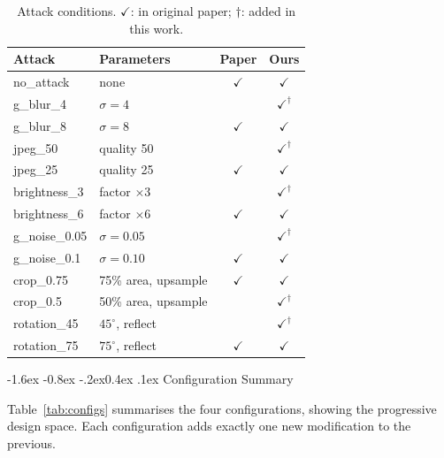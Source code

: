 \documentclass[10pt,twocolumn]{article}
\makeatletter
\renewcommand\subsection{\@startsection{subsection}{2}{\z@}%
  {-1.6ex \@plus -0.8ex \@minus -.2ex}{0.4ex \@plus .1ex}%
  {\normalfont\normalsize\itshape}}
\makeatother
\begin{document}
\begin{table}[htbp]
  \centering
  \caption{Attack conditions. $\checkmark$: in original paper;
    $\dagger$: added in this work.}
  \label{tab:attacks}
  \setlength{\tabcolsep}{3pt}
  \small
  \begin{tabular}{llcc}
    \toprule
    \textbf{Attack} & \textbf{Parameters} & \textbf{Paper} & \textbf{Ours} \\
    \midrule
    no\_attack        & none                 & $\checkmark$ & $\checkmark$ \\
    g\_blur\_4        & $\sigma{=}4$         & & $\checkmark^\dagger$ \\
    g\_blur\_8        & $\sigma{=}8$         & $\checkmark$ & $\checkmark$ \\
    jpeg\_50          & quality 50           & & $\checkmark^\dagger$ \\
    jpeg\_25          & quality 25           & $\checkmark$ & $\checkmark$ \\
    brightness\_3     & factor $\times 3$    & & $\checkmark^\dagger$ \\
    brightness\_6     & factor $\times 6$    & $\checkmark$ & $\checkmark$ \\
    g\_noise\_0.05    & $\sigma{=}0.05$      & & $\checkmark^\dagger$ \\
    g\_noise\_0.1     & $\sigma{=}0.10$      & $\checkmark$ & $\checkmark$ \\
    crop\_0.75        & 75\% area, upsample  & $\checkmark$ & $\checkmark$ \\
    crop\_0.5         & 50\% area, upsample  & & $\checkmark^\dagger$ \\
    rotation\_45      & $45^\circ$, reflect  & & $\checkmark^\dagger$ \\
    rotation\_75      & $75^\circ$, reflect  & $\checkmark$ & $\checkmark$ \\
    \bottomrule
  \end{tabular}
\end{table}

\subsection{Configuration Summary}

Table~\ref{tab:configs} summarises the four configurations, showing
the progressive design space. Each configuration adds exactly one
new modification to the previous.
\end{document}
